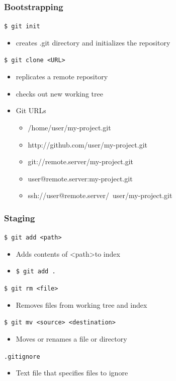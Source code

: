 \documentclass[english,compress]{beamer}
\begin{document}
\begin{frame}[fragile]
    \frametitle{Bootstrapping}
    
    \verb|$ git init|
    \begin{itemize}
        \item creates .git directory and initializes the repository
    \end{itemize}
    \verb|$ git clone <URL>|
    \begin{itemize}
        \item replicates a remote repository
        \item checks out new working tree
        \item Git URLs
            \begin{itemize}
                \item /home/user/my-project.git
                \item http://github.com/user/my-project.git
                \item git://remote.server/my-project.git
                \item user@remote.server:my-project.git
                \item ssh://user@remote.server/~user/my-project.git
            \end{itemize}
    \end{itemize}
\end{frame}

\begin{frame}[fragile]
    \frametitle{Staging}
    \verb|$ git add <path>|
    \begin{itemize}
        \item Adds contents of \textless path\textgreater to index
        \item \verb|$ git add .|
    \end{itemize}
    
    \verb|$ git rm <file>|
    \begin{itemize}
        \item Removes files from working tree and index
    \end{itemize}

    \verb|$ git mv <source> <destination>|
    \begin{itemize}
        \item Moves or renames a file or directory
    \end{itemize}
    \verb|.gitignore|
    \begin{itemize}
        \item Text file that specifies files to ignore
    \end{itemize}
\end{frame}
\end{document}
